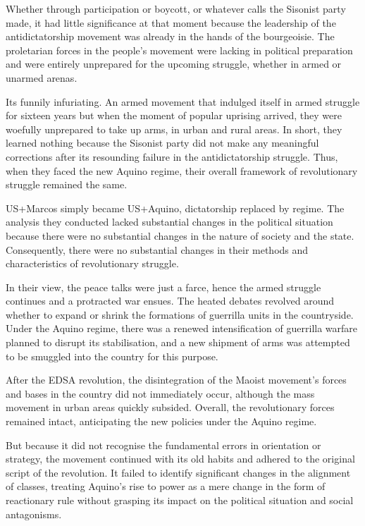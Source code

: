 Whether through participation or boycott, 
or whatever calls the Sisonist party made, 
it had little significance at that moment 
because the leadership of the antidictatorship movement 
was already in the hands of the bourgeoisie. 
The proletarian forces in the people's movement 
were lacking in political preparation 
and were entirely unprepared for the upcoming struggle, 
whether in armed or unarmed arenas.

Its funnily infuriating. 
An armed movement that indulged itself 
in armed struggle for sixteen years 
but when the moment of popular uprising arrived, 
they were woefully unprepared to take up arms, 
in urban and rural areas. 
In short, 
they learned nothing 
because the Sisonist party did not make any meaningful corrections 
after its resounding failure in the antidictatorship struggle. 
Thus, when they faced the new Aquino regime, 
their overall framework of revolutionary struggle remained the same.

US+Marcos simply became US+Aquino, 
dictatorship replaced by regime. 
The analysis they conducted lacked substantial changes 
in the political situation 
because there were no substantial changes 
in the nature of society and the state. 
Consequently, 
there were no substantial changes 
in their methods and characteristics of revolutionary struggle.

In their view, 
the peace talks were just a farce, 
hence the armed struggle continues and a protracted war ensues. 
The heated debates revolved around 
whether to expand or shrink the formations of guerrilla units 
in the countryside. 
Under the Aquino regime, 
there was a renewed intensification of guerrilla warfare 
planned to disrupt its stabilisation, 
and a new shipment of arms was attempted 
to be smuggled into the country for this purpose.

After the EDSA revolution, 
the disintegration of the Maoist movement's forces and bases in the country
did not immediately occur, 
although the mass movement in urban areas quickly subsided. 
Overall, 
the revolutionary forces remained intact, 
anticipating the new policies under the Aquino regime.

But because it did not recognise 
the fundamental errors in orientation or strategy, 
the movement continued with its old habits 
and adhered to the original script of the revolution. 
It failed to identify significant changes in the alignment of classes, 
treating Aquino's rise to power 
as a mere change in the form of reactionary rule 
without grasping its impact on the political situation and social antagonisms.

